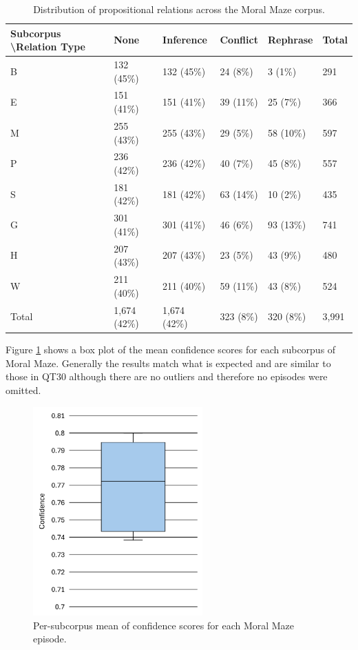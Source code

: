 \documentclass[twocolumn]{article}
\begin{document}
\begin{table}[t]
\centering
\caption{Distribution of propositional relations across the Moral Maze corpus. \label{tbl:moral-rel-no}}
\begin{tabular}{|l|llll|l|}
\hline
Subcorpus \textbackslash  Relation Type & None         & Inference    & Conflict  & Rephrase  & Total \\ \hline
B             & 132 (45\%)   & 132 (45\%)   & 24 (8\%)  & 3 (1\%)   & 291   \\
E             & 151 (41\%)   & 151 (41\%)   & 39 (11\%) & 25 (7\%)  & 366   \\
M             & 255 (43\%)   & 255 (43\%)   & 29 (5\%)  & 58 (10\%) & 597   \\
P             & 236 (42\%)   & 236 (42\%)   & 40 (7\%)  & 45 (8\%)  & 557   \\
S             & 181 (42\%)   & 181 (42\%)   & 63 (14\%) & 10 (2\%)  & 435   \\
G             & 301 (41\%)   & 301 (41\%)   & 46 (6\%)  & 93 (13\%) & 741   \\
H             & 207 (43\%)   & 207 (43\%)   & 23 (5\%)  & 43 (9\%)  & 480   \\
W             & 211 (40\%)   & 211 (40\%)   & 59 (11\%)  & 43 (8\%)  & 524   \\ \hline
Total         & 1,674 (42\%) & 1,674 (42\%) & 323 (8\%) & 320 (8\%) & 3,991 \\ \hline
\end{tabular}
\end{table}

Figure \ref{fig:mm-confidence-box} shows a box plot of the mean
confidence scores for each subcorpus of Moral Maze. Generally the
results match what is expected and are similar to those in QT30 although
there are no outliers and therefore no episodes were omitted.

\begin{figure}[h]
\centering
\includegraphics[height=8cm]{mm-confidence-box}
\caption{Per-subcorpus mean of confidence scores for each Moral Maze episode. \label{fig:mm-confidence-box}}
\end{figure}
\end{document}
